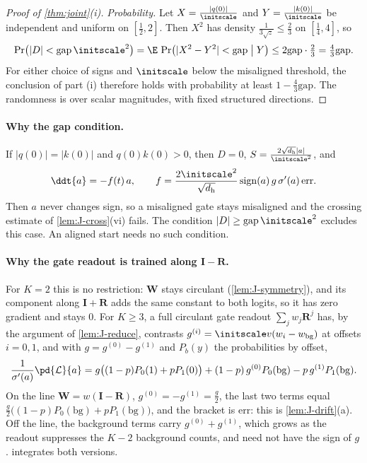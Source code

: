 \begin{proof}[Proof of \cref{thm:joint}(i)]
\emph{Probability.} Let $X=\frac{|q(0)|}{\initscale}$ and $Y=\frac{|k(0)|}{\initscale}$ be independent and uniform on $[\frac{1}{2},2]$. Then $X^2$ has density
$\frac{1}{3\sqrt z}\le\frac{2}{3}$ on $[\frac{1}{4},4]$, so
\[
 \Pr\bigl(|D|<\mathrm{gap}\,\initscale^2\bigr)=\E\,\Pr\bigl(|X^2-Y^2|<\mathrm{gap}\bigm|Y\bigr)\le2\mathrm{gap}\cdot\tfrac{2}{3}=\tfrac{4}{3}\mathrm{gap} .
\]
For either choice of signs and $\initscale$ below the misaligned threshold, the conclusion of part (i) therefore holds with
probability at least $1-\tfrac{4}{3}\mathrm{gap}$. The randomness is over scalar magnitudes, with fixed structured directions.\qedhere
\end{proof}

\paragraph{Why the gap condition.}\label{rem:J-balance} If $|q(0)|=|k(0)|$ and $q(0)k(0)>0$, then $D=0$, $S=\frac{2\sqrt{d_{\mathrm h}}|a|}{\initscale^2}$, and
\[
 \ddt{a}=-f(t)\,a,\qquad f=\frac{2\initscale^2}{\sqrt{d_{\mathrm h}}}\operatorname{sign}(a)\,g\,\sigma'(a)\,\mathrm{err} .
\]
Then $a$ never changes sign, so a misaligned gate stays misaligned and the crossing estimate of \cref{lem:J-cross}(vi) fails. The condition
$|D|\ge\mathrm{gap}\,\initscale^2$ excludes this case. An aligned start needs no such condition.

\paragraph{Why the gate readout is trained along $\mathbf I-\mathbf R$.}\label{rem:J-line} For $K=2$ this is no restriction: $\mathbf W$ stays circulant
(\cref{lem:J-symmetry}), and its component along $\mathbf I+\mathbf R$ adds the same constant to both logits, so it has zero gradient and stays $0$.
For $K\ge3$, a full circulant gate readout $\sum_jw_j\mathbf R^j$ has, by the argument of \cref{lem:J-reduce}, contrasts $g^{(i)}=\initscale v(w_i-w_{\mathrm{bg}})$
at offsets $i=0,1$, and with $g=g^{(0)}-g^{(1)}$ and $P_b(y)$ the probabilities by offset,
\[
 \frac{1}{\sigma'(a)}\pd{\mathcal L}{a}=g\bigl((1-p)P_0(1)+pP_1(0)\bigr)+(1-p)\,g^{(0)}P_0(\mathrm{bg})-p\,g^{(1)}P_1(\mathrm{bg}).
\]
On the line $\mathbf W=w(\mathbf I-\mathbf R)$, $g^{(0)}=-g^{(1)}=\frac{g}{2}$, the last two terms equal $\frac{g}{2}\bigl((1-p)P_0(\mathrm{bg})+pP_1(\mathrm{bg})\bigr)$, and the bracket is
$\mathrm{err}$: this is \cref{lem:J-drift}(a). Off the line, the background terms carry $g^{(0)}+g^{(1)}$, which grows as the readout suppresses the $K-2$
background counts, and need not have the sign of $g$.  integrates both versions.


